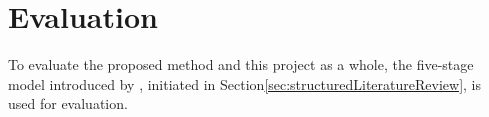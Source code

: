 \section{Evaluation}



To evaluate the proposed method and this project as a whole, the five-stage model introduced by \citet{cohen88} , initiated in Section\vref{sec:structuredLiteratureReview}, is used for evaluation. %

